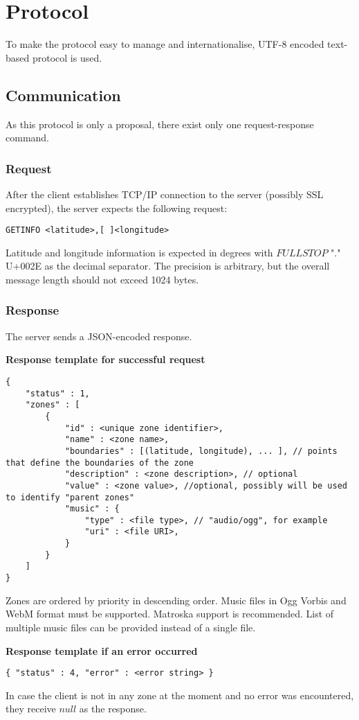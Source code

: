 \documentclass[10pt,a4paper,twocolumn,notitlepage]{article}
\begin{document}
\section{Protocol}
\label{sec:protocol}

To make the protocol easy to manage and internationalise, UTF-8 encoded text-based protocol is used.

\subsection{Communication}
As this protocol is only a proposal, there exist only one request-response command.

\subsubsection*{Request}
After the client establishes TCP/IP connection to the server (possibly SSL encrypted), the server expects the following request:

\begin{lstlisting}
GETINFO <latitude>,[ ]<longitude>
\end{lstlisting}

Latitude and longitude information is expected in degrees with $FULL STOP$ "." U+002E as the decimal separator. The precision is arbitrary, but the overall message length should not exceed 1024 bytes.

\subsubsection*{Response}
The server sends a JSON-encoded response. 

\textbf{Response template for successful request}
\begin{lstlisting}
{
	"status" : 1,
	"zones" : [
		{
			"id" : <unique zone identifier>,
			"name" : <zone name>,
			"boundaries" : [(latitude, longitude), ... ], // points that define the boundaries of the zone
			"description" : <zone description>, // optional
			"value" : <zone value>, //optional, possibly will be used to identify "parent zones"
			"music" : {
				"type" : <file type>, // "audio/ogg", for example
				"uri" : <file URI>,
			}
		}
	]
}
\end{lstlisting}

Zones are ordered by priority in descending order. Music files in Ogg Vorbis and WebM format must be supported. Matroska support is recommended. List of multiple music files can be provided instead of a single file.

\textbf{Response template if an error occurred}
\begin{lstlisting}
{ "status" : 4,	"error" : <error string> }
\end{lstlisting}

In case the client is not in any zone at the moment and no error was encountered, they receive $null$ as the response.
\end{document}
